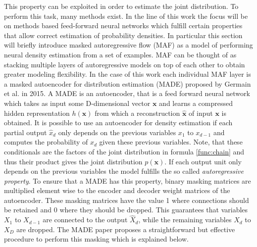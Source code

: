 \documentclass[11pt,titlepage,oneside,openany]{book}
\begin{document}
\noindent This property can be exploited in order to estimate the joint distribution. To perform this task, many methods exist. In the line of this work the focus will be on methods based feed-forward neural networks which fulfill certain properties that allow correct estimation of probability densities. In particular this section will briefly introduce masked autoregressive flow (MAF) \cite{papamakarios_masked_2017} as a model of performing neural density estimation from a set of examples. MAF can be thought of as stacking multiple layers of autoregressive models on top of each other to obtain greater modeling flexibility. In the case of this work each individual MAF layer is a masked autoencoder for distribution estimation (MADE) \cite{germain_made_nodate} proposed by Germain et al. in 2015. A MADE is an autoencoder, that is a feed forward neural network which takes as input some D-dimensional vector $\pmb{x}$ and learns a compressed hidden representation $h(\pmb{x})$ from which a reconstruction $\hat{\pmb{x}}$ of input $\pmb{x}$ is obtained. It is possible to use an autoencoder for density estimation if each partial output $\hat{x}_d$ only depends on the previous variables $x_1$ to $x_{d-1}$ and computes the probability of $x_d$ given these previous variables. Note, that these conditionals are the factors of the joint distribution in formula \ref{func:chain} and thus their product gives the joint distribution $p(\pmb{x})$. If each output unit only depends on the previous variables the model fulfills the so called \emph{autoregressive property}. To ensure that a MADE has this property, binary masking matrices are multiplied element wise to the encoder and decoder weight matrices of the autoencoder. These masking matrices have the value 1 where connections should be retained and 0 where they should be dropped. This guarantees that variables $X_1$ to $X_{d-1}$ are connected to the output $\hat{X}_d$, while the remaining variables $X_d$ to $X_D$ are dropped. The MADE paper \cite{germain_made_nodate} proposes a straightforward but effective procedure to perform this masking which is explained below.
\end{document}
